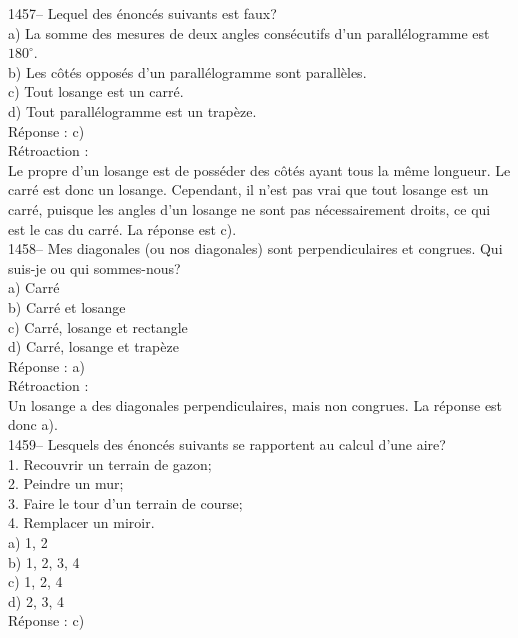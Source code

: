 1457-- Lequel des \'enonc\'es suivants est faux?\\
a) La somme des mesures de deux angles cons\'ecutifs d'un
parall\'elogramme est $180^{\circ}$.\\
b) Les c\^ot\'es oppos\'es d'un parall\'elogramme sont parall\`eles.\\
c) Tout losange est un carr\'e.\\
d) Tout parall\'elogramme est un trap\`eze.\\

R\'eponse : c)\\

R\'etroaction :\\
Le propre d'un losange est de poss\'eder des c\^ot\'es ayant tous la
m\^eme longueur. Le carr\'e est donc un losange. Cependant, il n'est
pas vrai que tout losange est
un carr\'e, puisque les angles d'un losange ne sont pas n\'ecessairement
droits, ce qui est le cas du carr\'e. La r\'eponse est c).\\

1458-- Mes diagonales (ou nos diagonales) sont perpendiculaires et congrues.
Qui suis-je ou qui sommes-nous?\\
a) Carr\'e\\
b) Carr\'e et losange\\
c) Carr\'e, losange et rectangle\\
d) Carr\'e, losange et trap\`eze\\

R\'eponse : a)\\

R\'etroaction :\\
Un losange a des diagonales perpendiculaires, mais non congrues. La
r\'eponse est donc a).\\

1459-- Lesquels des \'enonc\'es suivants se rapportent au calcul d'une aire?\\

1. Recouvrir un terrain de gazon;\\
2. Peindre un mur;\\
3. Faire le tour d'un terrain de course;\\
4. Remplacer un miroir.\\[3mm]
a) 1, 2\\
b) 1, 2, 3, 4\\
c) 1, 2, 4\\
d) 2, 3, 4\\

R\'eponse : c)\\

